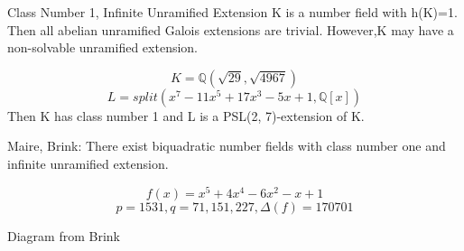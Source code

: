 \documentclass[10pt]{beamer}
\theoremstyle{plain} %
\begin{document}
\begin{frame}{Class Number 1, Infinite Unramified Extension}
K is a number field with h(K)=1. Then all abelian unramified Galois extensions are trivial. However,K may have a non-solvable unramified extension.
\begin{example}
\begin{equation}
   K=\mathbb{Q}(\sqrt{29},\sqrt{4967}) 
\end{equation}
\begin{equation}
   L=split(x^7 - 11x^5 + 17x^3 - 5x + 1,\mathbb{Q}[x])
\end{equation}
Then K has class number 1 and L is a PSL(2, 7)-extension of K.
\end{example}
Maire, Brink: There exist biquadratic number fields with class number one and infinite unramified extension.
\begin{example}
\begin{equation}
    f(x)=x^5+4x^4-6x^2-x+1
    \end{equation}
    \begin{equation}
p=1531,q=71,151,227,\Delta(f)=170701
\end{equation}
\end{example}
\end{frame}
\begin{frame}{Diagram from Brink}
    \begin{center}
\end{center}
\end{frame}
\end{document}
